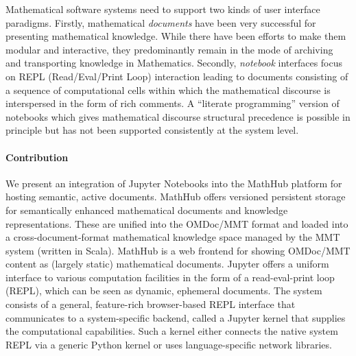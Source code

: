 

Mathematical software systems need to support two kinds of user interface paradigms.
Firstly, mathematical \emph{documents} have been very successful for presenting mathematical knowledge.
While there have been efforts to make them modular and interactive, they predominantly remain in the mode of archiving and transporting knowledge in Mathematics.
Secondly, \emph{notebook} interfaces focus on REPL (Read/Eval/Print Loop) interaction leading to documents consisting of a sequence of computational cells within which the mathematical discourse is interspersed in the form of rich comments.
A ``literate programming'' version of notebooks which gives mathematical discourse structural precedence is possible in principle but has not been supported consistently at the system level.

\paragraph{Contribution} We present an integration of Jupyter Notebooks into the MathHub platform for hosting semantic, active documents.
MathHub offers versioned persistent storage for semantically enhanced mathematical documents and knowledge representations.
These are unified into the OMDoc/MMT format and loaded into a cross-document-format mathematical knowledge space managed by the MMT system (written in Scala).  
MathHub is a web frontend for showing OMDoc/MMT content as (largely static) mathematical documents.
Jupyter offers a uniform interface to various computation facilities in the form of a read-eval-print loop (REPL), which can be seen as dynamic, ephemeral documents.
The system consists of a general, feature-rich browser-based REPL interface that communicates to a system-specific backend, called a Jupyter kernel that supplies the computational capabilities.
Such a kernel either connects the native system REPL via a generic Python kernel or uses language-specific network libraries. 

